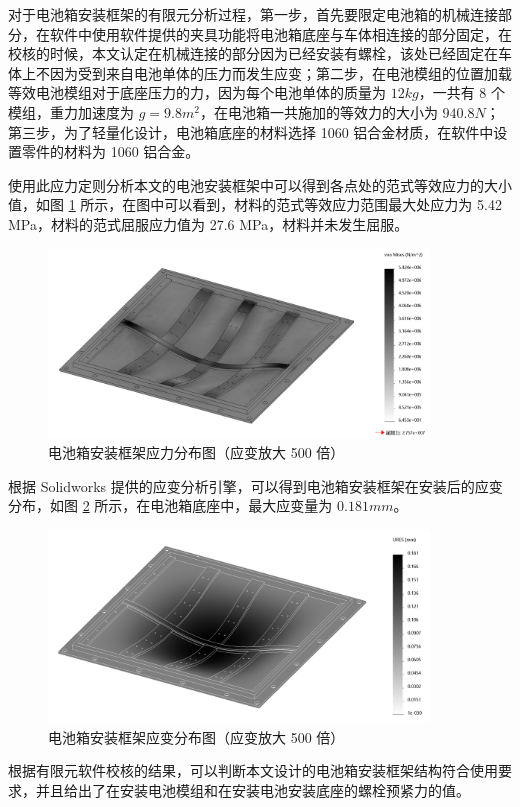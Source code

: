 对于电池箱安装框架的有限元分析过程，第一步，首先要限定电池箱的机械连接部分，在软件中使用软件提供的夹具功能将电池箱底座与车体相连接的部分固定，在校核的时候，本文认定在机械连接的部分因为已经安装有螺栓，该处已经固定在车体上不因为受到来自电池单体的压力而发生应变；第二步，在电池模组的位置加载等效电池模组对于底座压力的力，因为每个电池单体的质量为 $12 kg$，一共有 8 个模组，重力加速度为 $g=9.8m^2$，在电池箱一共施加的等效力的大小为 $940.8 N$；第三步，为了轻量化设计，电池箱底座的材料选择 1060 铝合金材质，在软件中设置零件的材料为 1060 铝合金。

使用此应力定则分析本文的电池安装框架中可以得到各点处的范式等效应力的大小值，如图 \ref{fig:yingli} 所示，在图中可以看到，材料的范式等效应力范围最大处应力为 5.42 MPa，材料的范式屈服应力值为 27.6 MPa，材料并未发生屈服。

\begin{figure}
	\centering
	\includegraphics[width=0.9\textwidth]{figures/yingli.png}
	\caption{电池箱安装框架应力分布图（应变放大 500 倍）}\label{fig:yingli}
\end{figure}

根据 Solidworks 提供的应变分析引擎，可以得到电池箱安装框架在安装后的应变分布，如图 \ref{fig:yingbian} 所示，在电池箱底座中，最大应变量为 $0.181 mm$。

\begin{figure}
	\centering
	\includegraphics[width=0.9\textwidth]{figures/yingbian.png}
	\caption{电池箱安装框架应变分布图（应变放大 500 倍）}\label{fig:yingbian}
\end{figure}

根据有限元软件校核的结果，可以判断本文设计的电池箱安装框架结构符合使用要求，并且给出了在安装电池模组和在安装电池安装底座的螺栓预紧力的值。